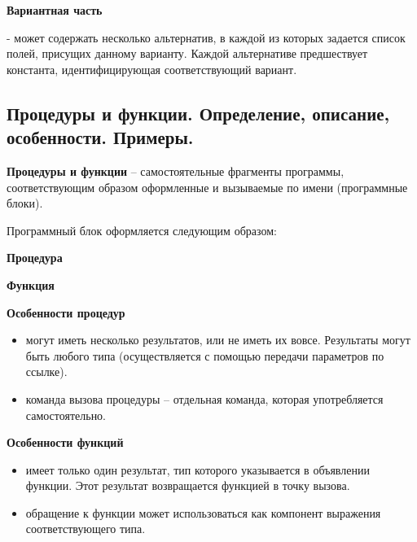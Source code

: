 \noindent
{\bf{Вариантная часть}}


- может содержать несколько альтернатив, в каждой из которых задается список полей, присущих данному варианту. Каждой альтернативе предшествует константа, идентифицирующая соответствующий вариант.






\newpage\subsection{Процедуры и функции. Определение, описание, особенности. Примеры. }

\begin{myquote}
            
\end{myquote}


{\bf{Процедуры и функции}} – самостоятельные фрагменты программы, соответствующим образом оформленные и вызываемые по имени (программные блоки).

\noindent
Программный блок оформляется следующим образом:


\noindent
{\bf{Процедура}}

\noindent
{\bf{Функция}}

\noindent
{\bf{Особенности процедур}}

\begin{itemize}
\item могут иметь несколько результатов, или не иметь их вовсе. Результаты могут быть любого типа (осуществляется с помощью передачи параметров по ссылке).

\item команда вызова процедуры – отдельная команда, которая употребляется самостоятельно.
\end{itemize}

\noindent
{\bf{Особенности функций}}
\begin{itemize}

\item имеет только один результат, тип которого указывается в объявлении функции. Этот результат возвращается функцией в точку вызова.

\item обращение к функции может использоваться как компонент выражения соответствующего типа.

\end{itemize}



